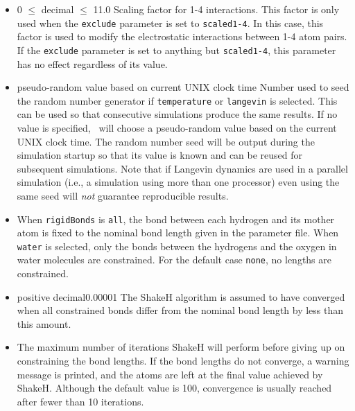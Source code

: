 \begin{itemize}
\item
{}%
{0 $\leq$ decimal $\leq$ 1}{1.0}
{Scaling factor for 1-4 interactions.  This factor is only used when the
\verb!exclude! parameter is set to \verb!scaled1-4!.  In this case, this
factor is used to modify the electrostatic interactions between 1-4 atom
pairs.  If the \verb!exclude! parameter is set to anything but 
\verb!scaled1-4!, this parameter has no effect regardless of its value.}

\item
{}%
{pseudo-random value based on current UNIX clock time}%
{Number used to seed the random number generator 
if {\tt temperature} or {\tt langevin} is selected.  This can be
used so that consecutive simulations produce the same results.
If no value is specified, \NAMD\ will choose a pseudo-random
value based on the current UNIX clock time.  The random number
seed will be output during the simulation startup so that
its value is known and can be reused for subsequent simulations.
Note that if Langevin dynamics are used in a parallel simulation 
(i.e., a simulation using more than one processor) 
even using the same seed will {\it not} guarantee reproducible results.
}

\item
{} 
{When {\tt rigidBonds} is {\tt all}, the bond between each hydrogen
and its mother atom is fixed to the nominal bond length given in the
parameter file.  When {\tt water} is selected, only the bonds between
the hydrogens and the oxygen in water molecules are constrained.  
For the default case \verb!none!, no lengths are constrained.
}

\item
{}%
{positive decimal}{0.00001}%
{
The ShakeH algorithm is assumed to have converged when all constrained
bonds differ from the nominal bond length by less than this amount.
}

\item
{}%
{
The maximum number of iterations ShakeH will perform before giving up
on constraining the bond lengths.  If the bond lengths do not
converge, a warning message is printed, and the atoms are left at the
final value achieved by ShakeH.  
Although the default value is 100, 
convergence is usually reached after fewer than 10 iterations.
}

\end{itemize}

